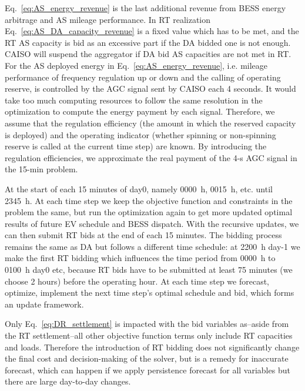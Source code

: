 \documentclass[conference]{IEEEtran}
\begin{document}
Eq.~\ref{eq:AS_energy_revenue} is the last additional revenue from BESS energy arbitrage and AS mileage performance. In RT realization Eq.~\ref{eq:AS_DA_capacity_revenue} is a fixed value which has to be met, and the RT AS capacity is bid as an excessive part if the DA bidded one is not enough. CAISO will suspend the aggregator if DA bid AS capacities are not met in RT. For the AS deployed energy in Eq.~\ref{eq:AS_energy_revenue}, i.e. mileage performance of frequency regulation up or down and the calling of operating reserve, is controlled by the AGC signal sent by CAISO each 4 seconds. It would take too much computing resources to follow the same resolution in the optimization to compute the energy payment by each signal. Therefore, we assume that the regulation efficiency (the amount in which the reserved capacity is deployed) and the operating indicator (whether spinning or non-spinning reserve is called at the current time step) are known. By introducing the regulation efficiencies, we approximate the real payment of the 4-s AGC signal in the 15-min problem. 



At the start of each 15 minutes of day0, namely 0000~h, 0015~h, etc. until 2345~h. At each time step we keep the objective function and constraints in the problem the same, but run the optimization again to get more updated optimal results of future EV schedule and BESS dispatch. With the recursive updates, we can then submit RT bids at the end of each 15 minutes. The bidding process remains the same as DA but follows a different time schedule: at 2200~h day-1 we make the first RT bidding which influences the time period from 0000~h to 0100~h day0 etc, because RT bids have to be submitted at least 75 minutes (we choose 2 hours) before the operating hour. At each time step we forecast, optimize, implement the next time step's optimal schedule and bid, which forms an update framework.

Only Eq.~\ref{eq:DR_settlement} is impacted with the bid variables as--aside from the RT settlement--all other objective function terms only include RT capacities and loads. Therefore the introduction of RT bidding does not significantly change the final cost and decision-making of the solver, but is a remedy for inaccurate forecast, which can happen if we apply persistence forecast for all variables but there are large day-to-day changes.
\end{document}
